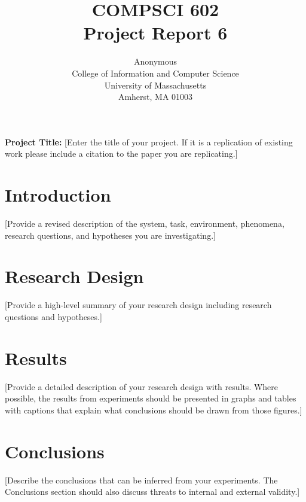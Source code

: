 \documentclass{article}
\title{COMPSCI 602 \\ Project Report 6}
\author{%
  Anonymous\\
  College of Information and Computer Science\\
  University of Massachusetts\\
  Amherst, MA 01003 \\
}
\begin{document}
\maketitle


\textbf{Project Title:} [Enter the title of your project. If it is a replication of existing work please include a citation to the paper you are replicating.] 


\section{Introduction}

[Provide a revised description of the system, task, environment, phenomena, research questions, and hypotheses you are investigating.]

\section{Research Design}

[Provide a high-level summary of your research design including research questions and hypotheses.]

\section{Results}

[Provide a detailed description of your research design with results. Where possible, the results from experiments should be presented in graphs and tables with captions that explain what conclusions should be drawn from those figures.]

\section{Conclusions}

[Describe the conclusions that can be inferred from your experiments. The Conclusions section should also discuss threats to internal and external validity.]




\end{document}
